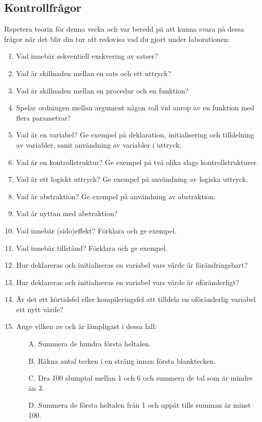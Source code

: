 \subsection{Kontrollfrågor}\Checkpoint

\noindent Repetera teorin för denna vecka och var beredd på att kunna svara på dessa frågor när det blir din tur att redovisa vad du gjort under laborationen:

\begin{enumerate}
\item Vad innebär sekventiell exekvering av satser?
\item Vad är skillnaden mellan en sats och ett uttryck?
\item Vad är skillnaden mellan en procedur och en funktion?
\item Spelar ordningen mellan argument någon roll vid anrop av en funktion med flera parametrar?
\item Vad är en variabel? Ge exempel på deklaration, initialisering och tilldelning av variabler, samt användning av variabler i uttryck.
\item Vad är en kontrollstruktur? Ge exempel på två olika slags kontrollstrukturer.
\item Vad är ett logiskt uttryck? Ge exempel på användning av logiska uttryck.
\item Vad är abstraktion? Ge exempel på användning av abstraktion.
\item Vad är nyttan med abstraktion?
\item Vad innebär (sido)effekt? Förklara och ge exempel.
\item Vad innebär tillstånd? Förklara och ge exempel.
\item Hur deklareras och initialiseras en variabel vars värde är förändringsbart?
\item Hur deklareras och initialiseras en variabel vars värde är oföränderligt?
\item Är det ett körtidsfel eller kompileringsfel att tilldela en oföränderlig variabel ett nytt värde?
\item Ange vilken av  och  är lämpligast i dessa fall:
\begin{itemize}[noitemsep, nolistsep]
\item[A.] Summera de hundra första heltalen.
\item[B.] Räkna antal tecken i en sträng innan första blanktecken.
\item[C.] Dra 100 slumptal mellan 1 och 6 och summera de tal som är mindre än 3.
\item[D.] Summera de första heltalen från 1 och uppåt tills summan är minst 100.
\end{itemize}
\end{enumerate}


